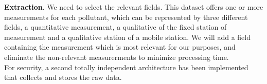 \textbf{Extraction}. We need to select the relevant fields.
This dataset offers one or more measurements for each pollutant, which can be represented by three different fields, a quantitative measurement, a qualitative of the fixed station of measurement and a qualitative station of a mobile station.
We will add a field containing the measurement which is most relevant for our purposes, and eliminate the non-relevant measurerments to minimize processing time. \\

For security, a second totally independent architecture has been implemented that collects and stores the raw data.